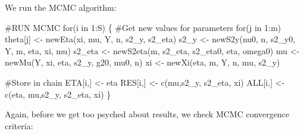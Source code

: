 \documentclass[]{article}
\newenvironment{Shaded}{\begin{snugshade}}{\end{snugshade}}
\newcommand{\KeywordTok}[1]{\textcolor[rgb]{0.94,0.87,0.69}{{#1}}}
\newcommand{\DecValTok}[1]{\textcolor[rgb]{0.86,0.86,0.80}{{#1}}}
\newcommand{\StringTok}[1]{\textcolor[rgb]{0.80,0.58,0.58}{{#1}}}
\newcommand{\CommentTok}[1]{\textcolor[rgb]{0.50,0.62,0.50}{{#1}}}
\newcommand{\NormalTok}[1]{\textcolor[rgb]{0.80,0.80,0.80}{{#1}}}
\begin{document}
\begin{Shaded}
\end{Shaded}

We run the MCMC algorithm:

\begin{Shaded}
\begin{Highlighting}[]
\CommentTok{#RUN MCMC}
\NormalTok{for(i in }\DecValTok{1}\NormalTok{:S)}
\NormalTok{\{}
  \CommentTok{#Get new values for parameters}
  \NormalTok{for(j in }\DecValTok{1}\NormalTok{:m) theta[j] <-}\StringTok{ }\KeywordTok{newEta}\NormalTok{(xi, mu, Y, n, s2_y, s2_eta)}
  \NormalTok{s2_y <-}\StringTok{ }\KeywordTok{newS2y}\NormalTok{(nu0, n, s2_y0, Y, m, eta, xi, mu)}
  \NormalTok{s2_eta <-}\StringTok{ }\KeywordTok{newS2eta}\NormalTok{(m, s2_eta, s2_eta0, eta, omega0)}
  \NormalTok{mu <-}\StringTok{ }\KeywordTok{newMu}\NormalTok{(Y, xi, eta, s2_y, g20, mu0, n)}
  \NormalTok{xi <-}\StringTok{ }\KeywordTok{newXi}\NormalTok{(eta, m, Y, n, mu, s2_y)}
  
  \CommentTok{#Store in chain}
  \NormalTok{ETA[i,] <-}\StringTok{ }\NormalTok{eta}
  \NormalTok{RES[i,] <-}\StringTok{ }\KeywordTok{c}\NormalTok{(mu,s2_y, s2_eta, xi)}
  \NormalTok{ALL[i,] <-}\StringTok{ }\KeywordTok{c}\NormalTok{(eta, mu,s2_y, s2_eta, xi)}
\NormalTok{\}}
\end{Highlighting}
\end{Shaded}

Again, before we get too psyched about results, we check MCMC
convergence criteria:
\end{document}

